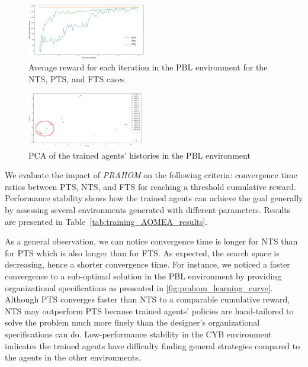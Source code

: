 \documentclass{ecai}
\begin{document}



\begin{figure}[h!]
    \centering
    \includegraphics[width=0.46\textwidth]{figures/prahom_learning_curve.png}
    \caption{Average reward for each iteration in the PBL environment for the NTS, PTS, and FTS cases}
    \label{fig:prahom_learning_curve}
\end{figure}
%
\begin{figure}[h!]
    \centering
    \includegraphics[width=0.45\textwidth]{figures/prahom_pca_analysis.png}
    \caption{PCA of the trained agents' histories in the PBL environment}
    \label{fig:prahom_pca_analysis}
\end{figure}
%
We evaluate the impact of \emph{PRAHOM} on the following criteria: convergence time ratios between PTS, NTS, and FTS for reaching a threshold cumulative reward. Performance stability shows how the trained agents can achieve the goal generally by assessing several environments generated with different parameters. Results are presented in Table~\ref{tab:training_AOMEA_results}.
%

%
As a general observation, we can notice convergence time is longer for NTS than for PTS which is also longer than for FTS. As expected, the search space is decreasing, hence a shorter convergence time. For instance, we noticed a faster convergence to a sub-optimal solution in the PBL environment by providing organizational specifications as presented in \autoref{fig:prahom_learning_curve}. Although PTS converges faster than NTS to a comparable cumulative reward, NTS may outperform PTS because trained agents' policies are hand-tailored to solve the problem much more finely than the designer's organizational specifications can do. Low-performance stability in the CYB environment indicates the trained agents have difficulty finding general strategies compared to the agents in the other environments.
\end{document}
